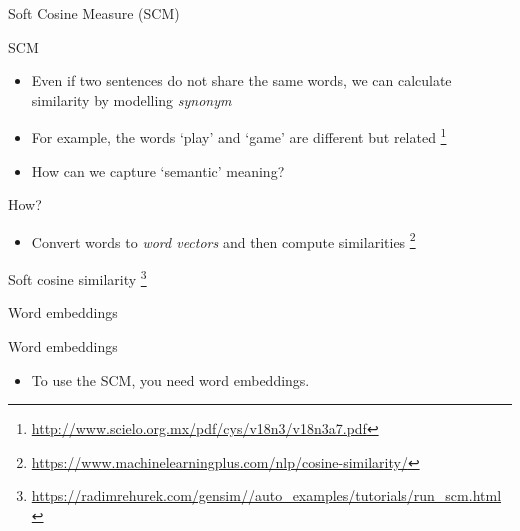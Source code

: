 \documentclass[handout]{beamer}
\begin{document}
\begin{frame}{Soft Cosine Measure (SCM)}
	\begin{block}{SCM}
		\begin{itemize}
			\item <1-> Even if two sentences do not share the same words, we can calculate similarity by modelling \emph{synonym}
			\item <2->For example, the words `play' and `game' are different but related \parencite{Sidorov2014} \footnote{\url{http://www.scielo.org.mx/pdf/cys/v18n3/v18n3a7.pdf}}
			\item<3->How can we capture `semantic' meaning?
		\end{itemize}
	\end{block}
	\begin{exampleblock}{How?}
		\begin{itemize}
			\item <4-> Convert words to \emph{word vectors} and then compute similarities  \footnote{\url{https://www.machinelearningplus.com/nlp/cosine-similarity/}}
		\end{itemize}
	\end{exampleblock}
\end{frame}


\begin{frame}
	Soft cosine similarity \footnote{\url{https://radimrehurek.com/gensim//auto_examples/tutorials/run_scm.html}}
\end{frame}

\begin{frame}{Word embeddings}
	\begin{block}{Word embeddings}
		\begin{itemize}
			\item <1->To use the SCM, you need word embeddings. 
		\end{itemize}
	\end{block}
\end{frame}
\end{document}
